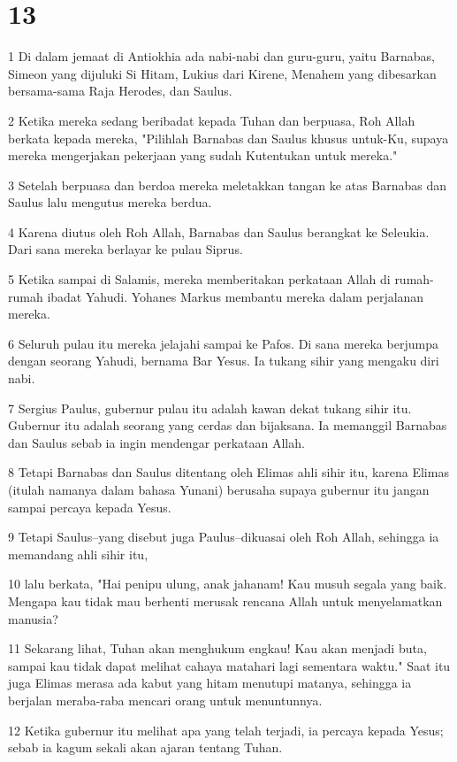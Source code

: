 \chapter{13}

\par 1 Di dalam jemaat di Antiokhia ada nabi-nabi dan guru-guru, yaitu Barnabas, Simeon yang dijuluki Si Hitam, Lukius dari Kirene, Menahem yang dibesarkan bersama-sama Raja Herodes, dan Saulus.
\par 2 Ketika mereka sedang beribadat kepada Tuhan dan berpuasa, Roh Allah berkata kepada mereka, "Pilihlah Barnabas dan Saulus khusus untuk-Ku, supaya mereka mengerjakan pekerjaan yang sudah Kutentukan untuk mereka."
\par 3 Setelah berpuasa dan berdoa mereka meletakkan tangan ke atas Barnabas dan Saulus lalu mengutus mereka berdua.
\par 4 Karena diutus oleh Roh Allah, Barnabas dan Saulus berangkat ke Seleukia. Dari sana mereka berlayar ke pulau Siprus.
\par 5 Ketika sampai di Salamis, mereka memberitakan perkataan Allah di rumah-rumah ibadat Yahudi. Yohanes Markus membantu mereka dalam perjalanan mereka.
\par 6 Seluruh pulau itu mereka jelajahi sampai ke Pafos. Di sana mereka berjumpa dengan seorang Yahudi, bernama Bar Yesus. Ia tukang sihir yang mengaku diri nabi.
\par 7 Sergius Paulus, gubernur pulau itu adalah kawan dekat tukang sihir itu. Gubernur itu adalah seorang yang cerdas dan bijaksana. Ia memanggil Barnabas dan Saulus sebab ia ingin mendengar perkataan Allah.
\par 8 Tetapi Barnabas dan Saulus ditentang oleh Elimas ahli sihir itu, karena Elimas (itulah namanya dalam bahasa Yunani) berusaha supaya gubernur itu jangan sampai percaya kepada Yesus.
\par 9 Tetapi Saulus--yang disebut juga Paulus--dikuasai oleh Roh Allah, sehingga ia memandang ahli sihir itu,
\par 10 lalu berkata, "Hai penipu ulung, anak jahanam! Kau musuh segala yang baik. Mengapa kau tidak mau berhenti merusak rencana Allah untuk menyelamatkan manusia?
\par 11 Sekarang lihat, Tuhan akan menghukum engkau! Kau akan menjadi buta, sampai kau tidak dapat melihat cahaya matahari lagi sementara waktu." Saat itu juga Elimas merasa ada kabut yang hitam menutupi matanya, sehingga ia berjalan meraba-raba mencari orang untuk menuntunnya.
\par 12 Ketika gubernur itu melihat apa yang telah terjadi, ia percaya kepada Yesus; sebab ia kagum sekali akan ajaran tentang Tuhan.
